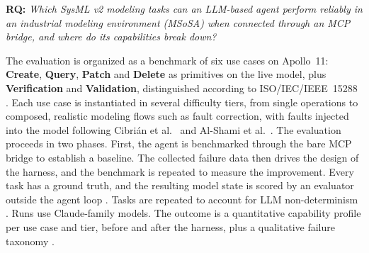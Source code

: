 %
%
\medskip
\textbf{RQ:} \textit{Which SysML v2 modeling tasks can an LLM-based agent perform reliably in an industrial modeling environment (MSoSA) when connected through an MCP bridge, and where do its capabilities break down?}
\medskip

%
%
The evaluation is organized as a benchmark of six use cases on Apollo~11: \textbf{Create}, \textbf{Query}, \textbf{Patch} and \textbf{Delete} as primitives on the live model, plus \textbf{Verification} and \textbf{Validation}, distinguished according to ISO/IEC/IEEE~15288 \citep{iso-15288}. Each use case is instantiated in several difficulty tiers, from single operations to composed, realistic modeling flows such as fault correction, with faults injected into the model following Cibri\'an et al.\ \citep{cibrian2025validation} and Al-Shami et al.\ \citep{alshami2026faultloc}. The evaluation proceeds in two phases. First, the agent is benchmarked through the bare MCP bridge to establish a baseline. The collected failure data then drives the design of the harness, and the benchmark is repeated to measure the improvement. Every task has a ground truth, and the resulting model state is scored by an evaluator outside the agent loop \citep{wang2026pufibara}. Tasks are repeated to account for LLM non-determinism \citep{pradasgomez2026ductile}. Runs use Claude-family models. The outcome is a quantitative capability profile per use case and tier, before and after the harness, plus a qualitative failure taxonomy \citep{molinari2026engiai}.
